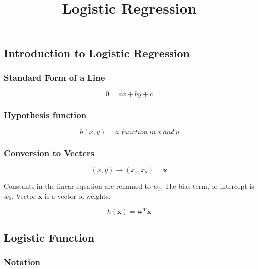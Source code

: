 \documentclass[11pt]{article}
\title{Logistic Regression}
\begin{document}
    
    
    \maketitle
    
    

    
    \hypertarget{introduction-to-logistic-regression}{%
\subsection{Introduction to Logistic
Regression}\label{introduction-to-logistic-regression}}

    \hypertarget{standard-form-of-a-line}{%
\subsubsection{Standard Form of a Line}\label{standard-form-of-a-line}}

    \[0 = ax + by + c\]

    \hypertarget{hypothesis-function}{%
\subsubsection{Hypothesis function}\label{hypothesis-function}}

    \[h(x,y) = a \ function \ in \ x \ and \ y\]

    \hypertarget{conversion-to-vectors}{%
\subsubsection{Conversion to Vectors}\label{conversion-to-vectors}}

    \[(x, y) \rightarrow (x_{1}, x_{2}) = \textbf{x}\]

    Constants in the linear equation are renamed to \(w_{i}\). The bias
term, or intercept is \(w_{0}\). Vector \(\textbf{x}\) is a vector of
weights.

    \[h(\textbf{x}) = \textbf{w}^{\textbf{T}}\textbf{x}\]

    \hypertarget{logistic-function}{%
\subsection{Logistic Function}\label{logistic-function}}

    \hypertarget{notation}{%
\subsubsection{Notation}\label{notation}}
\end{document}
